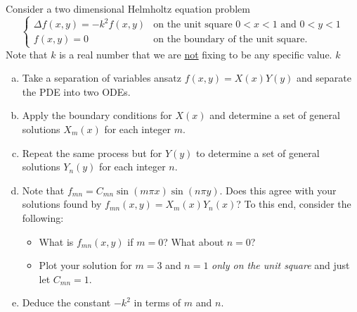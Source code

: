 \documentclass[12pt]{amsbook}
\begin{document}
\begin{problem}
Consider a two dimensional Helmholtz equation problem
\[
\begin{cases}
    \Delta f(x,y) = -k^2 f(x,y) & \textrm{on the unit square $0<x<1$ and $0<y<1$}\\
    f(x,y) = 0 & \textrm{on the boundary of the unit square}.
\end{cases}
\]
Note that $k$ is a real number that we are \underline{not} fixing to be any specific value. $k$ 
\begin{enumerate}[(a)]
\vspace*{0.25cm}
    \item Take a separation of variables ansatz $f(x,y)=X(x)Y(y)$ and separate the PDE into two ODEs.
\vspace*{0.25cm}
    \item Apply the boundary conditions for $X(x)$ and determine a set of general solutions $X_m(x)$ for each integer $m$.
\vspace*{0.25cm}
    \item Repeat the same process but for $Y(y)$ to determine a set of general solutions $Y_n(y)$ for each integer $n$.
\vspace*{0.25cm}
    \item Note that $f_{mn}=C_{mn}\sin(m\pi x)\sin(n \pi y)$. Does this agree with your solutions found by $f_{mn}(x,y)=X_m(x)Y_n(x)$? To this end, consider the following:
\vspace*{0.25cm}
\begin{itemize}
    \item What is $f_{mn}(x,y)$ if $m=0$? What about $n=0$? 
\vspace*{0.25cm}
    \item Plot your solution for $m=3$ and $n=1$ \emph{only on the unit square} and just let $C_{mn}=1$.
\end{itemize}
\vspace*{0.25cm}
    \item Deduce the constant $-k^2$ in terms of $m$ and $n$. 
\end{enumerate}
\end{problem}
\end{document}
